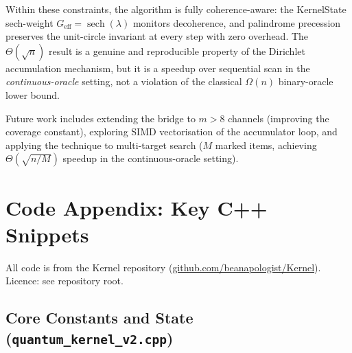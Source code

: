 \documentclass[12pt,a4paper]{article}
\theoremstyle{plain}
\theoremstyle{definition}
\theoremstyle{remark}
\begin{document}
Within these constraints, the algorithm is fully coherence-aware: the
KernelState sech-weight $G_{\text{eff}} = \operatorname{sech}(\lambda)$
monitors decoherence, and palindrome precession preserves the unit-circle
invariant at every step with zero overhead.  The $\Theta(\sqrt{n})$ result
is a genuine and reproducible property of the Dirichlet accumulation
mechanism, but it is a speedup over sequential scan in the
\emph{continuous-oracle} setting, not a violation of the classical
$\Omega(n)$ binary-oracle lower bound.

Future work includes extending the bridge to $m > 8$ channels (improving the
coverage constant), exploring SIMD vectorisation of the accumulator loop, and
applying the technique to multi-target search ($M$ marked items, achieving
$\Theta(\sqrt{n/M})$ speedup in the continuous-oracle setting).

\appendix
\section{Code Appendix: Key C++ Snippets}
\label{sec:appendix}

All code is from the Kernel repository
(\href{https://github.com/beanapologist/Kernel}{github.com/beanapologist/Kernel}).
Licence: see repository root.

\subsection{Core Constants and State (\texttt{quantum\_kernel\_v2.cpp})}
\label{app:constants}
\end{document}

